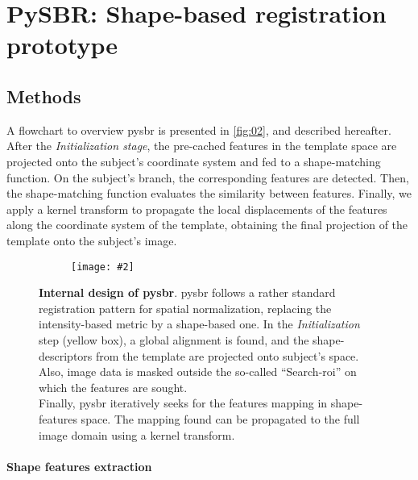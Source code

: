 \documentclass{frontiers}
\newcommand{\insertgraphic}[2]{\texttt{[image: \#2]}}
\newcommand{\insertgraphic}[2]{\texttt{[image: \#2]}}
\begin{document}
\section{PySBR: Shape-based registration prototype}
\subsection{Methods}
A flowchart to overview \gls*{pysbr} is presented in \autoref{fig:02},
  and described hereafter.
After the \emph{Initialization stage}, the pre-cached features in the template space are projected
  onto the subject's coordinate system and fed to a shape-matching function.
On the subject's branch, the corresponding features are detected.
Then, the shape-matching function evaluates the similarity between features.
Finally, we apply a kernel transform to propagate the local displacements of
  the features along the coordinate system of the template, obtaining the final
  projection of the template onto the subject's image.

\begin{figure*}[!ht]
\centering
  \begin{subfigure}[bt]{0.65\textwidth}
    \insertgraphic{width=\linewidth}{figures/02-RegistrationFlowDiagram}
  \end{subfigure}
  \hfill
  \begin{minipage}[bt]{0.30\textwidth}
  \caption{\label{fig:02}
  \textbf{Internal design of \gls*{pysbr}}. \Gls*{pysbr} follows a rather standard
  registration pattern for spatial normalization, replacing the intensity-based
  metric by a shape-based one. In the \emph{Initialization} step (yellow box),
  a global alignment is found, and the shape-descriptors from the template
  are projected onto subject's space. Also, image data is masked outside the
  so-called ``Search-\gls*{roi}'' on which the features are sought. \\
  Finally, \gls*{pysbr} iteratively seeks for the features mapping in
  shape-features space. The mapping found can be propagated to the full
  image domain using a kernel transform.
  }
  \end{minipage}
\end{figure*}


\paragraph{Shape features extraction}
\label{sec:shape_features}
\end{document}

